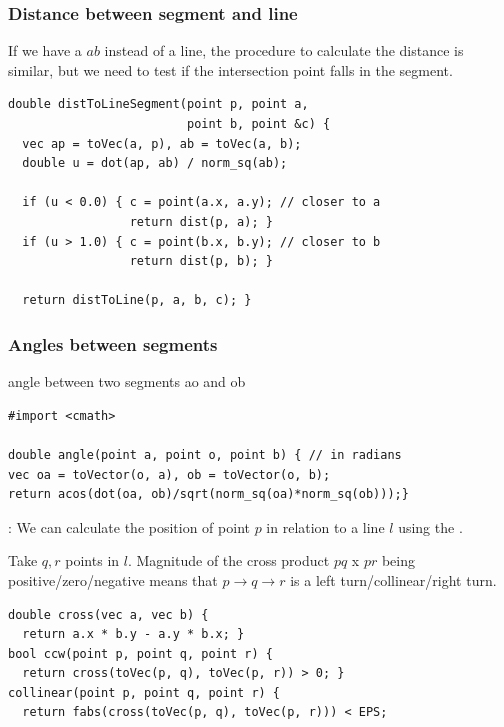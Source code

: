 \documentclass{beamer}
\begin{document}
\begin{frame}
  \frametitle{Distance between segment and line} 

  {\smaller 
    If we have a  $ab$ instead of a line, the
    procedure to calculate the distance is similar, but we need to
    test if the intersection point falls in the segment.
    
    \begin{exampleblock}{}
\begin{verbatim}
double distToLineSegment(point p, point a, 
                         point b, point &c) {
  vec ap = toVec(a, p), ab = toVec(a, b);
  double u = dot(ap, ab) / norm_sq(ab);
  
  if (u < 0.0) { c = point(a.x, a.y); // closer to a
                 return dist(p, a); }
  if (u > 1.0) { c = point(b.x, b.y); // closer to b
                 return dist(p, b); }

  return distToLine(p, a, b, c); }
\end{verbatim}
    \end{exampleblock}
  }
\end{frame}

\begin{frame}
  \frametitle{Angles between segments}
  {\smaller

    \begin{exampleblock}{angle between two segments ao and ob}
\begin{verbatim}
#import <cmath>

double angle(point a, point o, point b) { // in radians
vec oa = toVector(o, a), ob = toVector(o, b);
return acos(dot(oa, ob)/sqrt(norm_sq(oa)*norm_sq(ob)));}
\end{verbatim}
    \end{exampleblock}

: We can calculate the position of point
$p$ in relation to a line $l$ using the .

\smallskip

Take $q,r$ points in $l$. Magnitude of the cross product $pq$ x $pr$
being positive/zero/negative means that $p \rightarrow q \rightarrow
r$ is a left turn/collinear/right turn.

\begin{exampleblock}{}
\begin{verbatim}
double cross(vec a, vec b) { 
  return a.x * b.y - a.y * b.x; } 
bool ccw(point p, point q, point r) { 
  return cross(toVec(p, q), toVec(p, r)) > 0; } 
collinear(point p, point q, point r) { 
  return fabs(cross(toVec(p, q), toVec(p, r))) < EPS;
\end{verbatim}
\end{exampleblock}
}
\end{frame}
\end{document}
